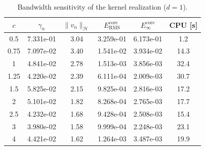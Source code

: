 \begin{table}[tb]
  \centering
  \small
  \caption{Bandwidth sensitivity of the kernel realization ($d=1$).}
  \label{tab:ker.eps_d1}
  \begin{tabular}{cccccc}
    \toprule
    $c$ & $\gamma_n$ & $\|v_n\|_{\mathcal H}$ & $E_{\mathrm{RMS}}^{\mathrm{core}}$ & $E_{\infty}^{\mathrm{core}}$ & CPU [s] \\
    \midrule
    0.5 & 7.331e-01 & 3.04 & 3.259e-01 & 6.173e-01 & 1.2 \\
    0.75 & 7.097e-02 & 3.40 & 1.541e-02 & 3.934e-02 & 14.3 \\
    1 & 4.841e-02 & 2.78 & 1.513e-03 & 3.856e-03 & 32.4 \\
    1.25 & 4.220e-02 & 2.39 & 6.111e-04 & 2.009e-03 & 30.7 \\
    1.5 & 5.825e-02 & 2.15 & 9.825e-04 & 2.816e-03 & 17.2 \\
    2 & 5.101e-02 & 1.82 & 8.268e-04 & 2.765e-03 & 17.7 \\
    2.5 & 4.232e-02 & 1.68 & 9.428e-04 & 2.508e-03 & 15.4 \\
    3 & 3.980e-02 & 1.58 & 9.999e-04 & 2.248e-03 & 23.1 \\
    4 & 4.421e-02 & 1.62 & 1.264e-03 & 3.487e-03 & 19.9 \\
    \bottomrule
  \end{tabular}
\end{table}
